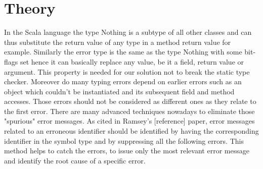 \section{Theory}

In the Scala language the type {\ttfamily Nothing} is a subtype of all other classes and can thus substitute the return value of any type in a method return value for example.
Similarly the error type is the same as the type {\ttfamily Nothing} with some bit-flags set hence it can basically replace any value, be it a field, return value or argument. This property is needed for our solution not to break the static type checker.
Moreover do many typing errors depend on earlier errors such as an object which couldn't be instantiated and its subsequent field and method accesses. Those errors should not be considered as different ones as they relate to the first error. There are many advanced techniques nowadays to eliminate those "spurious" error messages. As cited in Ramsey's [reference] paper, error messages related to an erroneous identifier should be identified by having the corresponding identifier in the symbol type and by suppressing all the following errors. This method helps to catch the errors, to issue only the most relevant error message and identify the root cause of a specific error.